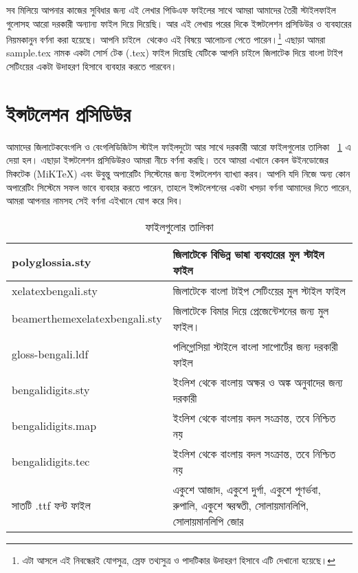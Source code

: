 সব মিলিয়ে আপনার কাজের সুবিধার জন্য এই লেখার পিডিএফ ফাইলের সাথে আমরা আমাদের তৈরী স্টাইলফাইল গুলোসহ আরো দরকারী অন্যান্য ফাইল দিয়ে দিয়েছি। আর এই লেখায় পরের দিকে ইন্সটলেশন প্রসিডিউর ও ব্যবহারের নিয়মকানুন বর্ণনা করা হয়েছে। আপনি চাইলে ‌\cite{thisdoc} থেকেও এই বিষয়ে  আলোচনা পেতে পারেন।\footnote{এটা আসলে এই নিবন্ধেরই যোগসুত্র, স্রেফ তথ্যসুত্র ও পাদটিকার উদাহরণ হিসাবে এটি দেখানো হয়েছে।} এছাড়া আমরা sample.tex নামক একটা সোর্স টেক (.tex) ফাইল দিয়েছি যেটিকে আপনি চাইলে জিলাটেক দিয়ে বাংলা টাইপ সেটিংয়ের একটা উদাহরণ হিসাবে ব্যবহার করতে পারবেন। 

\section{ইন্সটলেশন প্রসিডিউর}

আমাদের জিলাটেকবেংগলি ও বেংগলিডিজিটস স্টাইল ফাইলদুটো আর সাথে দরকারী আরো ফাইলগুলোর তালিকা \tablename~\ref{thistable} এ দেয়া হল। এছাড়া ইন্সটলেশন প্রসিডিউরও আমরা নীচে বর্ণনা করছি। তবে আমরা এখানে কেবল উইনডোজের মিকটেক (MiKTeX) এবং উবুন্তু অপারেটিং সিস্টেমের জন্য ইন্সটলেশন ব্যাখ্যা করব। আপনি যদি নিজে অন্য কোন অপারেটিং সিস্টেমে সফল ভাবে ব্যবহার করতে পারেন, তাহলে ইন্সটলেশনের একটা খসড়া বর্ণনা আমাদের দিতে পারেন, আমরা আপনার নামসহ সেই বর্ণনা এইখানে যোগ করে দিব। 

\begin{table}[!hbt]
	\caption{ফাইলগুলোর তালিকা\label{thistable}}
	\begin{center}\begin{footnotesize}
	\begin{tabular}{|l|l|}
		\hline
		polyglossia.sty & জিলাটেকে বিভিন্ন ভাষা ব্যবহারের মুল স্টাইল ফাইল‌‌\\\hline
		xelatexbengali.sty & জিলাটেকে বাংলা টাইপ সেটিংয়ের মুল স্টাইল ফাইল\\\hline
		beamerthemexelatexbengali.sty & জিলাটেকে বিমার দিয়ে প্রেজেন্টেশনের জন্য মুল ফাইল।\\\hline 
		gloss-bengali.ldf & পলিগ্লোসিয়া স্টাইলে বাংলা সাপোর্টের জন্য দরকারী ফাইল\\\hline
		bengalidigits.sty & ইংলিশ থেকে বাংলায় অক্ষর ও অঙ্ক অনুবাদের জন্য দরকারী\\\hline
		bengalidigits.map &	 \begin{minipage}{0.5\textwidth}ইংলিশ থেকে বাংলায় বদল সংক্রান্ত, তবে নিশ্চিত নয়\end{minipage}\\\hline
		bengalidigits.tec & \begin{minipage}{0.5\textwidth}ইংলিশ থেকে বাংলায় বদল সংক্রান্ত, তবে নিশ্চিত নয়\end{minipage}\\\hline
               সাতটি .ttf ফন্ট ফাইল & \begin{minipage}{0.5\textwidth}একুশে আজাদ, একুশে দুর্গা, একুশে পূণর্ভবা, রুপালি, একুশে স্বরস্বতী, সোলায়মানলিপি, সোলায়মানলিপি জোর\end{minipage}\\\hline
	\end{tabular}
	\end{footnotesize}\end{center}
\end{table}

